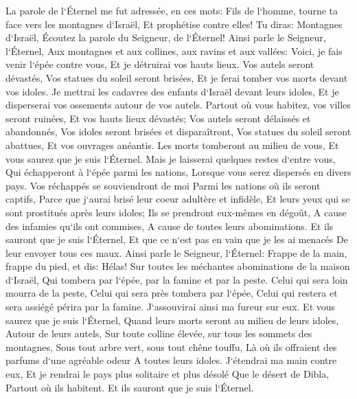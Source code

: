\verse La parole de l`Éternel me fut adressée, en ces mots: 
\verse Fils de l`homme, tourne ta face vers les montagnes d`Israël, Et prophétise contre elles! 
\verse Tu diras: Montagnes d`Israël, Écoutez la parole du Seigneur, de l`Éternel! Ainsi parle le Seigneur, l`Éternel, Aux montagnes et aux collines, aux ravins et aux vallées: Voici, je fais venir l`épée contre vous, Et je détruirai vos hauts lieux. 
\verse Vos autels seront dévastés, Vos statues du soleil seront brisées, Et je ferai tomber vos morts devant vos idoles. 
\verse Je mettrai les cadavres des enfants d`Israël devant leurs idoles, Et je disperserai vos ossements autour de vos autels. 
\verse Partout où vous habitez, vos villes seront ruinées, Et vos hauts lieux dévastés; Vos autels seront délaissés et abandonnés, Vos idoles seront brisées et disparaîtront, Vos statues du soleil seront abattues, Et vos ouvrages anéantis. 
\verse Les morts tomberont au milieu de vous, Et vous saurez que je suis l`Éternel. 
\verse Mais je laisserai quelques restes d`entre vous, Qui échapperont à l`épée parmi les nations, Lorsque vous serez dispersés en divers pays. 
\verse Vos réchappés se souviendront de moi Parmi les nations où ils seront captifs, Parce que j`aurai brisé leur coeur adultère et infidèle, Et leurs yeux qui se sont prostitués après leurs idoles; Ils se prendront eux-mêmes en dégoût, A cause des infamies qu`ils ont commises, A cause de toutes leurs abominations. 
\verse Et ils sauront que je suis l`Éternel, Et que ce n`est pas en vain que je les ai menacés De leur envoyer tous ces maux. 
\verse Ainsi parle le Seigneur, l`Éternel: Frappe de la main, frappe du pied, et dis: Hélas! Sur toutes les méchantes abominations de la maison d`Israël, Qui tombera par l`épée, par la famine et par la peste. 
\verse Celui qui sera loin mourra de la peste, Celui qui sera près tombera par l`épée, Celui qui restera et sera assiégé périra par la famine. J`assouvirai ainsi ma fureur sur eux. 
\verse Et vous saurez que je suis l`Éternel, Quand leurs morts seront au milieu de leurs idoles, Autour de leurs autels, Sur toute colline élevée, sur tous les sommets des montagnes, Sous tout arbre vert, sous tout chêne touffu, Là où ils offraient des parfums d`une agréable odeur A toutes leurs idoles. 
\verse J`étendrai ma main contre eux, Et je rendrai le pays plus solitaire et plus désolé Que le désert de Dibla, Partout où ils habitent. Et ils sauront que je suis l`Éternel. 

\chapter{}

